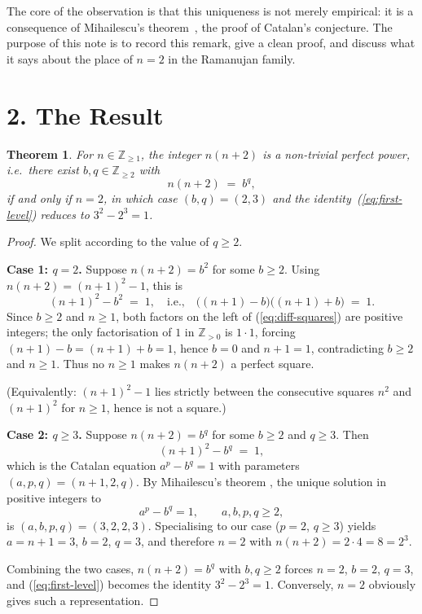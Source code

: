 \documentclass[12pt,a4paper]{article}
\newtheorem{theorem}{Theorem}
\begin{document}
The core of the observation is that this uniqueness is not merely
empirical: it is a consequence of Mihailescu's
theorem~\cite{Mihailescu2004}, the proof of Catalan's conjecture.  The
purpose of this note is to record this remark, give a clean proof, and
discuss what it says about the place of $n=2$ in the Ramanujan family.

\section*{2. The Result}

\begin{theorem}\label{thm:main}
For $n \in \mathbb{Z}_{\geq 1}$, the integer $n(n+2)$ is a non-trivial
perfect power, i.e.\ there exist $b, q \in \mathbb{Z}_{\geq 2}$ with
\[
n(n+2) \;=\; b^{q},
\]
if and only if $n = 2$, in which case $(b, q) = (2, 3)$ and the
identity~(\ref{eq:first-level}) reduces to
$3^{2} - 2^{3} = 1$.
\end{theorem}

\begin{proof}
We split according to the value of $q \geq 2$.

\medskip
\noindent\textbf{Case 1: $q = 2$.}  Suppose $n(n+2) = b^2$ for some
$b \geq 2$.  Using $n(n+2) = (n+1)^2 - 1$, this is
\begin{equation}
(n+1)^2 - b^2 \;=\; 1,
\quad\text{i.e.,}\quad
\bigl((n+1) - b\bigr)\bigl((n+1) + b\bigr) \;=\; 1.
\label{eq:diff-squares}
\end{equation}
Since $b \geq 2$ and $n \geq 1$, both factors on the left of
(\ref{eq:diff-squares}) are positive integers; the only factorisation
of $1$ in $\mathbb{Z}_{>0}$ is $1 \cdot 1$, forcing
$(n+1) - b = (n+1) + b = 1$, hence $b = 0$ and $n + 1 = 1$,
contradicting $b \geq 2$ and $n \geq 1$.  Thus no $n \geq 1$ makes
$n(n+2)$ a perfect square.

(Equivalently: $(n+1)^2 - 1$ lies strictly between the consecutive
squares $n^2$ and $(n+1)^2$ for $n \geq 1$, hence is not a square.)

\medskip
\noindent\textbf{Case 2: $q \geq 3$.}  Suppose $n(n+2) = b^q$ for some
$b \geq 2$ and $q \geq 3$.  Then
\begin{equation}
(n+1)^2 - b^q \;=\; 1,
\label{eq:cat-shape}
\end{equation}
which is the Catalan equation $a^p - b^q = 1$ with parameters
$(a, p, q) = (n+1, 2, q)$.  By Mihailescu's theorem
\cite{Mihailescu2004}, the unique solution in positive integers to
\[
a^p - b^q = 1, \qquad a, b, p, q \geq 2,
\]
is $(a, b, p, q) = (3, 2, 2, 3)$.  Specialising to our case
($p = 2$, $q \geq 3$) yields $a = n+1 = 3$, $b = 2$, $q = 3$, and
therefore $n = 2$ with $n(n+2) = 2 \cdot 4 = 8 = 2^3$.

\medskip
Combining the two cases, $n(n+2) = b^q$ with $b, q \geq 2$ forces
$n = 2$, $b = 2$, $q = 3$, and (\ref{eq:first-level}) becomes the
identity $3^2 - 2^3 = 1$.  Conversely, $n = 2$ obviously gives such a
representation.
\end{proof}
\end{document}
